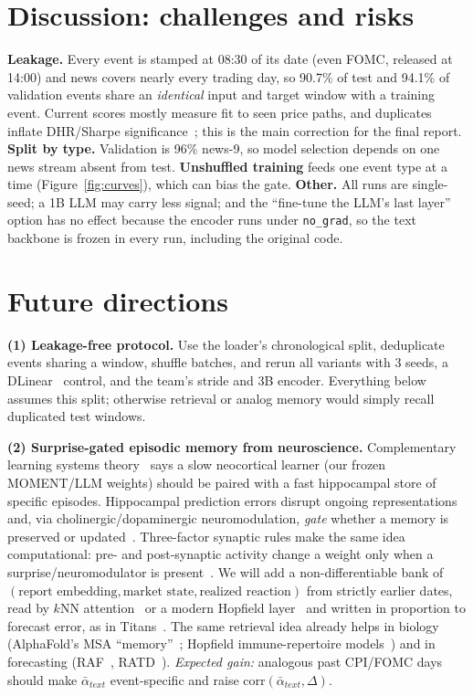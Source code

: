 \documentclass{article}
\begin{document}
\section{Discussion: challenges and risks}\label{sec:disc}
\textbf{Leakage.} Every event is stamped at 08:30 of its date (even FOMC, released at 14:00) and news covers nearly every trading day, so 90.7\% of test and 94.1\% of validation events share an \emph{identical} input and target window with a training event. Current scores mostly measure fit to seen price paths, and duplicates inflate DHR/Sharpe significance~\cite{lopezdeprado}; this is the main correction for the final report.
\textbf{Split by type.} Validation is 96\% news-9, so model selection depends on one news stream absent from test.
\textbf{Unshuffled training} feeds one event type at a time (Figure~\ref{fig:curves}), which can bias the gate.
\textbf{Other.} All runs are single-seed; a 1B LLM may carry less signal; and the ``fine-tune the LLM's last layer'' option has no effect because the encoder runs under \texttt{no\_grad}, so the text backbone is frozen in every run, including the original code.

\section{Future directions}
\textbf{(1) Leakage-free protocol.} Use the loader's chronological split, deduplicate events sharing a window, shuffle batches, and rerun all variants with 3 seeds, a DLinear~\cite{dlinear} control, and the team's stride and 3B encoder. Everything below assumes this split; otherwise retrieval or analog memory would simply recall duplicated test windows.

\textbf{(2) Surprise-gated episodic memory from neuroscience.} Complementary learning systems theory~\cite{cls} says a slow neocortical learner (our frozen MOMENT/LLM weights) should be paired with a fast hippocampal store of specific episodes. Hippocampal prediction errors disrupt ongoing representations and, via cholinergic/dopaminergic neuromodulation, \emph{gate} whether a memory is preserved or updated~\cite{sinclair2021,neuromod}. Three-factor synaptic rules make the same idea computational: pre- and post-synaptic activity change a weight only when a surprise/neuromodulator is present~\cite{threefactor}. We will add a non-differentiable bank of $(\text{report embedding}, \text{market state}, \text{realized reaction})$ from strictly earlier dates, read by $k$NN attention~\cite{memorizing} or a modern Hopfield layer~\cite{hopfield} and written in proportion to forecast error, as in Titans~\cite{titans}. The same retrieval idea already helps in biology (AlphaFold's MSA ``memory''~\cite{alphafold}; Hopfield immune-repertoire models~\cite{deeprc}) and in forecasting (RAF~\cite{raf}, RATD~\cite{ratd}). \emph{Expected gain:} analogous past CPI/FOMC days should make $\bar\alpha_{text}$ event-specific and raise $\mathrm{corr}(\bar\alpha_{text},\Delta)$.
\end{document}
